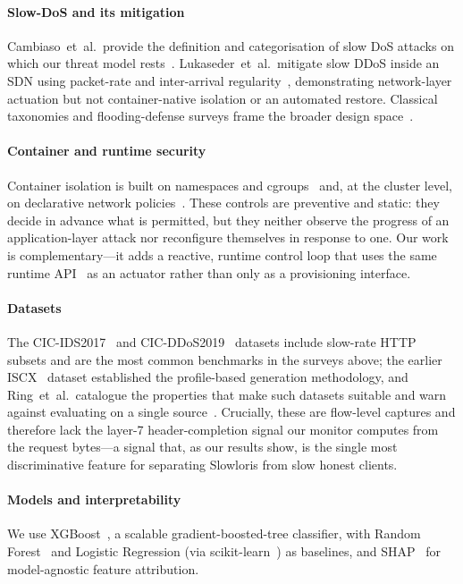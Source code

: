 \documentclass[conference]{IEEEtran}
\begin{document}
\paragraph{Slow-DoS and its mitigation}
Cambiaso~et~al.\ provide the definition and categorisation of slow DoS attacks on
which our threat model rests~\cite{cambiaso2013slow}. Lukaseder~et~al.\ mitigate
slow DDoS inside an SDN using packet-rate and inter-arrival
regularity~\cite{lukaseder2018sdn}, demonstrating network-layer actuation but not
container-native isolation or an automated restore. Classical taxonomies and
flooding-defense surveys frame the broader design
space~\cite{mirkovic2004taxonomy,zargar2013survey}.

\paragraph{Container and runtime security}
Container isolation is built on namespaces and cgroups~\cite{merkel2014docker} and,
at the cluster level, on declarative network
policies~\cite{k8s_netpol}. These controls are preventive and static: they decide
in advance what is permitted, but they neither observe the progress of an
application-layer attack nor reconfigure themselves in response to one. Our work is
complementary---it adds a reactive, runtime control loop that uses the same
runtime API~\cite{docker_engine_api} as an actuator rather than only as a
provisioning interface.

\paragraph{Datasets}
The CIC-IDS2017~\cite{sharafaldin2018cicids} and CIC-DDoS2019~\cite{sharafaldin2019ddos}
datasets include slow-rate HTTP subsets and are the most common benchmarks in the
surveys above; the earlier ISCX~\cite{shiravi2012iscx} dataset established the
profile-based generation methodology, and Ring~et~al.\ catalogue the properties
that make such datasets suitable and warn against evaluating on a single
source~\cite{ring2019survey}. Crucially, these are flow-level captures and
therefore lack the layer-7 header-completion signal our monitor computes from the
request bytes---a signal that, as our results show, is the single most
discriminative feature for separating Slowloris from slow honest clients.

\paragraph{Models and interpretability}
We use XGBoost~\cite{chen2016xgboost}, a scalable gradient-boosted-tree
classifier, with Random Forest~\cite{breiman2001rf} and Logistic Regression
(via scikit-learn~\cite{pedregosa2011sklearn}) as baselines, and
SHAP~\cite{lundberg2017shap} for model-agnostic feature attribution.
\end{document}
